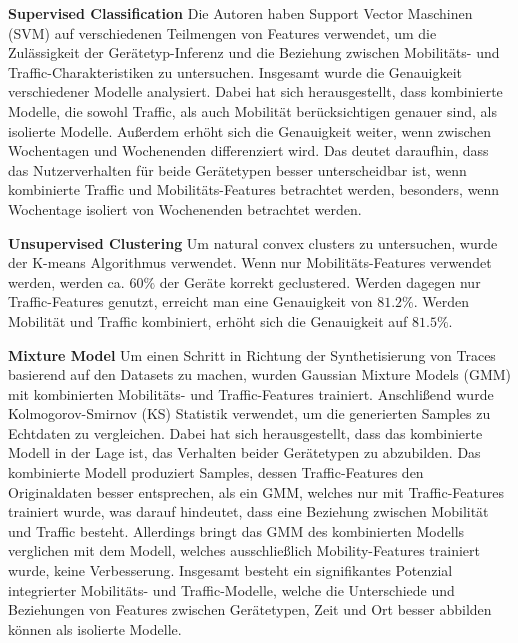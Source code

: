 \documentclass[12pt, a4paper]{article}
\begin{document}
\textbf{Supervised Classification}\newline
Die Autoren haben Support Vector Maschinen (SVM) auf verschiedenen Teilmengen von Features
verwendet, um die Zulässigkeit der Gerätetyp-Inferenz und die Beziehung zwischen Mobilitäts- und Traffic-Charakteristiken
zu untersuchen. Insgesamt wurde die Genauigkeit verschiedener Modelle analysiert. Dabei hat sich herausgestellt,
dass kombinierte Modelle, die sowohl Traffic, als auch Mobilität berücksichtigen genauer sind,
als isolierte Modelle. Außerdem erhöht sich die Genauigkeit weiter, wenn zwischen Wochentagen und Wochenenden differenziert wird.
Das deutet daraufhin, dass das Nutzerverhalten für beide Gerätetypen besser unterscheidbar ist, wenn kombinierte
Traffic und Mobilitäts-Features betrachtet werden, besonders, wenn Wochentage isoliert von Wochenenden betrachtet werden.

\textbf{Unsupervised Clustering}\newline
Um natural convex clusters zu untersuchen, wurde der K-means Algorithmus verwendet.
Wenn nur Mobilitäts-Features verwendet werden, werden ca. $60 \%$ der Geräte korrekt geclustered.
Werden dagegen nur Traffic-Features genutzt, erreicht man eine Genauigkeit von $81.2 \%$.
Werden Mobilität und Traffic kombiniert, erhöht sich die Genauigkeit auf $81.5 \%$.

\textbf{Mixture Model}\newline
Um einen Schritt in Richtung der Synthetisierung von Traces basierend auf den Datasets zu machen,
wurden Gaussian Mixture Models (GMM) mit kombinierten Mobilitäts- und Traffic-Features trainiert.
Anschlißend wurde Kolmogorov-Smirnov (KS) Statistik verwendet, um die generierten Samples zu Echtdaten zu vergleichen.
Dabei hat sich herausgestellt, dass das kombinierte Modell in der Lage ist, das Verhalten beider Gerätetypen zu abzubilden.
Das kombinierte Modell produziert Samples, dessen Traffic-Features den Originaldaten besser entsprechen, als ein GMM,
welches nur mit Traffic-Features trainiert wurde, was darauf hindeutet, dass eine Beziehung zwischen Mobilität und Traffic besteht.
Allerdings bringt das GMM des kombinierten Modells verglichen mit dem Modell, welches ausschließlich Mobility-Features trainiert wurde,
keine Verbesserung.
\newline\newline
Insgesamt besteht ein signifikantes Potenzial integrierter Mobilitäts- und Traffic-Modelle, welche die Unterschiede
und Beziehungen von Features zwischen Gerätetypen, Zeit und Ort besser abbilden können als isolierte Modelle.
\end{document}
